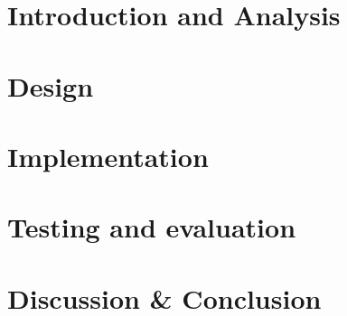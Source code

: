\documentclass[11pt]{report}
\title{}
\subtitle{}
\begin{document}
    

    \maketitle

    \tableofcontents



    \chapter{Introduction and Analysis}\label{ch:introduction-and-analysis}


    
    
    
    

    \chapter{Design}\label{ch:design}

    
    
    

    \chapter{Implementation}\label{ch:implementation}

    
    
    
    
    

    \chapter{Testing and evaluation}\label{ch:testing-and-evaluation}

    
    
    

    \chapter{Discussion \& Conclusion}\label{ch:discussion-conclusion}

    
    
    

    \appendix

    \printglossary[type=\acronymtype]

    \printbibliography[heading=bibintoc]
\end{document}
